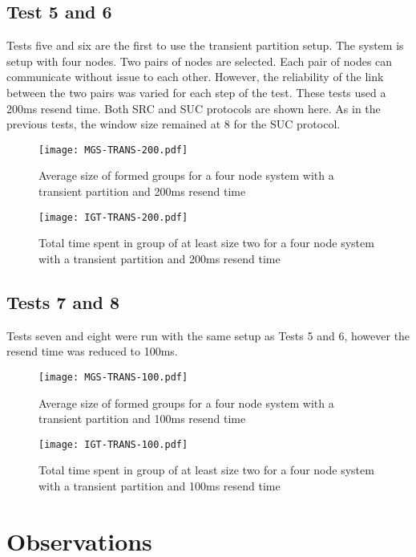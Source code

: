 \subsection{Test 5 and 6}

Tests five and six are the first to use the transient partition setup. The system is setup with four nodes. Two pairs of nodes are selected. Each pair of nodes can communicate without issue to each other. However, the reliability of the link between the two pairs was varied for each step of the test. These tests used a 200ms resend time. Both SRC and SUC protocols are shown here. As in the previous tests, the window size remained at 8 for the SUC protocol.

\begin{figure}[!h]
\centering
\texttt{[image: MGS-TRANS-200.pdf]}
\caption{Average size of formed groups for a four node system with a transient partition and 200ms resend time}
\label{fig:MGS-TRANS-200}
\end{figure}

\begin{figure}[!h]
\centering
\texttt{[image: IGT-TRANS-200.pdf]}
\caption{Total time spent in group of at least size two for a four node system with a transient partition and 200ms resend time}
\label{fig:IGT-TRANS-200}
\end{figure}

\subsection{Tests 7 and 8}

Tests seven and eight were run with the same setup as Tests 5 and 6, however the resend time was reduced to 100ms.

\begin{figure}[!h]
\centering
\texttt{[image: MGS-TRANS-100.pdf]}
\caption{Average size of formed groups for a four node system with a transient partition and 100ms resend time}
\label{fig:MGS-TRANS-100}
\end{figure}

\begin{figure}[!h]
\centering
\texttt{[image: IGT-TRANS-100.pdf]}
\caption{Total time spent in group of at least size two for a four node system with a transient partition and 100ms resend time}
\label{fig:IGT-TRANS-100}
\end{figure}

\section{Observations}

